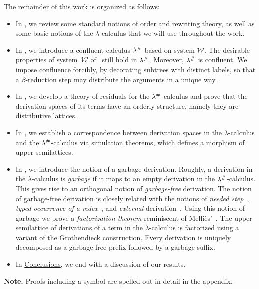The remainder of this work is organized as follows:
\begin{itemize}
\item
  In , we review some standard notions of order and rewriting theory, as well as some
  basic notions of the $\lambda$-calculus that we will use throughout the work.
\item
  In , we introduce a confluent calculus $\lambda^{\mathtt{\#}}$ based on system $\mathcal{W}$.
  The desirable properties of system~$\mathcal{W}$ of~\cite{bucciarelli2017non} still hold in $\lambda^{\mathtt{\#}}$.
  Moreover, $\lambda^{\mathtt{\#}}$ is confluent.
  We impose confluence forcibly, by decorating subtrees with distinct labels, so that
  a $\beta$-reduction step may distribute the arguments in a unique way.
\item
  In , we develop a theory of residuals for the
  $\lambda^{\mathtt{\#}}$-calculus and prove that the derivation spaces of its terms
  have an orderly structure, namely they are distributive lattices.
\item
  In , we establish a correspondence between derivation spaces in the
  $\lambda$-calculus and the $\lambda^{\mathtt{\#}}$-calculus via simulation theorems,
  which defines a morphism of upper semilattices.
\item
  In , we introduce the notion of a garbage derivation.
  Roughly, a derivation in the $\lambda$-calculus is {\em garbage} if it maps to
  an empty derivation in the $\lambda^{\mathtt{\#}}$-calculus.
  This gives rise to an orthogonal notion of {\em garbage-free} derivation.
  The notion of garbage-free derivation is closely related
  with the notions of {\em needed step}~\cite[Section~8.6]{Terese},
  {\em typed occurrence of a redex}~\cite{bucciarelli2017non},
  and {\em external} derivation~\cite{DBLP:conf/ctcs/Mellies97}.
  Using this notion of garbage we prove a {\em factorization theorem}
  reminiscent of Melli\`es'~\cite{DBLP:conf/ctcs/Mellies97}.
  The upper semilattice of derivations of a term in the $\lambda$-calculus
  is factorized using a variant of the Grothendieck construction.
  Every derivation is uniquely decomposed as a garbage-free prefix followed by a garbage suffix.
\item
  In \hyperref[ch:conclusions]{Conclusions}, we end with a discussion of our results.
\end{itemize}
\bigskip
{\bf Note.} Proofs including a \SeeAppendix symbol are spelled out in detail in the appendix.
